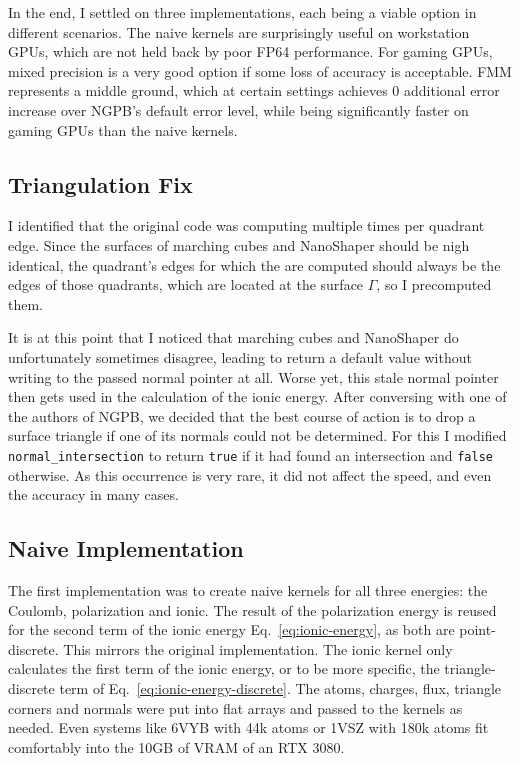In the end, I settled on three implementations, each being a viable option in different scenarios.
The naive kernels are surprisingly useful on workstation GPUs, which are not held back by poor FP64 performance.
For gaming GPUs, mixed precision is a very good option if some loss of accuracy is acceptable.
FMM represents a middle ground, which at certain settings achieves 0 additional error increase over NGPB's default error level, while being significantly faster on gaming GPUs than the naive kernels.

\subsection{Triangulation Fix}
\label{sec:implementation-energy-calculation-triangulation-fix}

I identified that the original code was computing  multiple times per quadrant edge.
Since the surfaces of marching cubes and NanoShaper should be nigh identical, the quadrant's edges for which the  are computed should always be the edges of those quadrants, which are located at the surface $\Gamma$, so I precomputed them.

It is at this point that I noticed that marching cubes and NanoShaper do unfortunately sometimes disagree, leading  to return a default value without writing to the passed normal pointer at all.
Worse yet, this stale normal pointer then gets used in the calculation of the ionic energy.
After conversing with one of the authors of NGPB, we decided that the best course of action is to drop a surface triangle if one of its normals could not be determined.
For this I modified \texttt{normal\_intersection} to return \texttt{true} if it had found an intersection and \texttt{false} otherwise.
As this occurrence is very rare, it did not affect the speed, and even the accuracy in many cases.

\subsection{Naive Implementation}
\label{sec:implementation-energy-calculation-naive-kernels}

The first implementation was to create naive kernels for all three energies: the Coulomb, polarization and ionic.
The result of the polarization energy is reused for the second term of the ionic energy Eq.~\eqref{eq:ionic-energy}, as both are point-discrete.
This mirrors the original implementation.
The ionic kernel only calculates the first term of the ionic energy, or to be more specific, the triangle-discrete term of Eq.~\eqref{eq:ionic-energy-discrete}.
The atoms, charges, flux, triangle corners and normals were put into flat arrays and passed to the kernels as needed.
Even systems like 6VYB with 44k atoms or 1VSZ with 180k atoms fit comfortably into the 10GB of VRAM of an RTX 3080.

